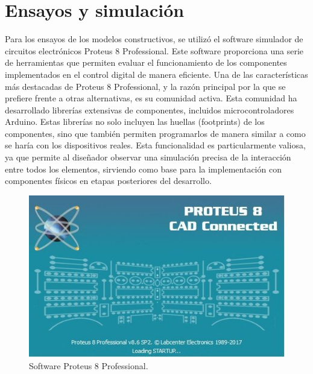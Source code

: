 \section{Ensayos y simulación}
Para los ensayos de los modelos constructivos, se utilizó el software simulador de circuitos electrónicos Proteus 8 Professional. Este software proporciona una serie de herramientas que permiten evaluar el funcionamiento de los componentes implementados en el control digital de manera eficiente.
Una de las características más destacadas de Proteus 8 Professional, y la razón principal por la que se prefiere frente a otras alternativas, es su comunidad activa. Esta comunidad ha desarrollado librerías extensivas de componentes, incluidos microcontroladores Arduino. Estas librerías no solo incluyen las huellas (footprints) de los componentes, sino que también permiten programarlos de manera similar a como se haría con los dispositivos reales. Esta funcionalidad es particularmente valiosa, ya que permite al diseñador observar una simulación precisa de la interacción entre todos los elementos, sirviendo como base para la implementación con componentes físicos en etapas posteriores del desarrollo.
\begin{figure}[H]
    \centering
    \includegraphics[scale=0.4]{./imagenes/proteus_logo.jpg}
    \caption{Software Proteus 8 Professional.}
    \label{F:proteus_logo}
\end{figure}


